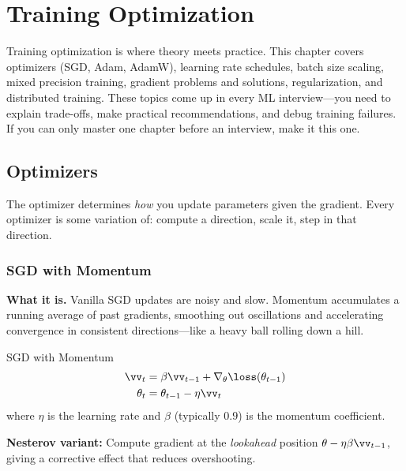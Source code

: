 \chapter{Training Optimization}
\label{chap:training_optimization}

\begin{tldr}
Training optimization is where theory meets practice. This chapter covers optimizers (SGD, Adam, AdamW), learning rate schedules, batch size scaling, mixed precision training, gradient problems and solutions, regularization, and distributed training. These topics come up in every ML interview---you need to explain trade-offs, make practical recommendations, and debug training failures. If you can only master one chapter before an interview, make it this one.
\end{tldr}

\section{Optimizers}
\label{sec:optimizers}

The optimizer determines \textit{how} you update parameters given the gradient. Every optimizer is some variation of: compute a direction, scale it, step in that direction.

\subsection{SGD with Momentum}

\textbf{What it is.} Vanilla SGD updates are noisy and slow. Momentum accumulates a running average of past gradients, smoothing out oscillations and accelerating convergence in consistent directions---like a heavy ball rolling down a hill.

\begin{mathresult}{SGD with Momentum}
\begin{align}
\vv_t &= \beta \vv_{t-1} + \nabla_\theta \loss(\theta_{t-1}) \\
\theta_t &= \theta_{t-1} - \eta \vv_t
\end{align}
where $\eta$ is the learning rate and $\beta$ (typically $0.9$) is the momentum coefficient.

\textbf{Nesterov variant:} Compute gradient at the \emph{lookahead} position $\theta - \eta \beta \vv_{t-1}$, giving a corrective effect that reduces overshooting.
\end{mathresult}

